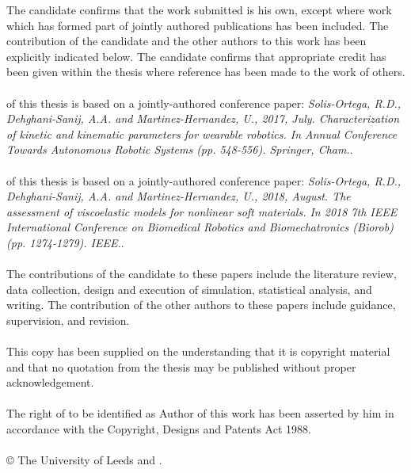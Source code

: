 
\begin{ipstatement}
The candidate confirms that the work submitted is his own, except where work which has formed part of jointly authored publications has been included. The contribution of the candidate and the other authors to this work has been explicitly indicated below. The candidate confirms that appropriate credit has been given within the thesis where reference has been made to the work of others.
\\
\\
 of this thesis is based on a jointly-authored conference paper: \textit{Solis-Ortega, R.D., Dehghani-Sanij, A.A. and Martinez-Hernandez, U., 2017, July. Characterization of kinetic and kinematic parameters for wearable robotics. In Annual Conference Towards Autonomous Robotic Systems (pp. 548-556). Springer, Cham.}.
\\
\\
 of this thesis is based on a jointly-authored conference paper: \textit{Solis-Ortega, R.D., Dehghani-Sanij, A.A. and Martinez-Hernandez, U., 2018, August. The assessment of viscoelastic models for nonlinear soft materials. In 2018 7th IEEE International Conference on Biomedical Robotics and Biomechatronics (Biorob) (pp. 1274-1279). IEEE.}.
\\
\\
The contributions of the candidate to these papers include the literature review, data collection, design and execution of simulation, statistical analysis, and writing. The contribution of the other authors to these papers include guidance, supervision, and revision.
\\
\\
This copy has been supplied on the understanding that it is copyright material and that no quotation from the thesis may be published without proper acknowledgement.
\\
\\
The right of \theAuthor{} to be identified as Author of this work has been asserted by him in accordance with the Copyright, Designs and Patents Act 1988.
\\
\\
\copyright{} \yeardate{\today} The University of Leeds and \theAuthor{}.

\label{ips}
\end{ipstatement}


